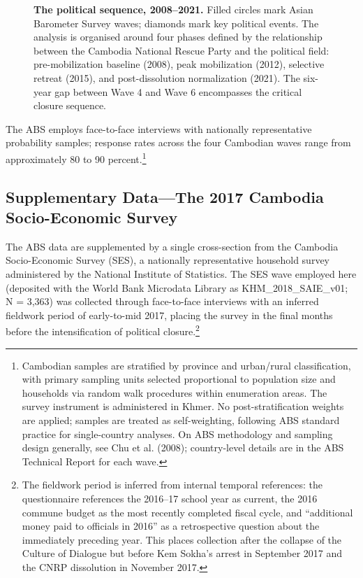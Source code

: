 \documentclass[
  12pt,
  letterpaper]{article}
\begin{document}
\begin{figure}[!htbp]
\caption{\textbf{The political sequence, 2008--2021.}
Filled circles mark Asian Barometer Survey waves; diamonds mark key political events.
The analysis is organised around four phases defined by the relationship between the
Cambodia National Rescue Party and the political field: pre-mobilization baseline (2008),
peak mobilization (2012), selective retreat (2015), and post-dissolution normalization (2021).
The six-year gap between Wave 4 and Wave 6 encompasses the critical closure sequence.}
\label{fig:timeline}
\end{figure}

The ABS employs face-to-face interviews with nationally representative
probability samples; response rates across the four Cambodian waves
range from approximately 80 to 90 percent.\footnote{Cambodian samples
  are stratified by province and urban/rural classification, with
  primary sampling units selected proportional to population size and
  households via random walk procedures within enumeration areas. The
  survey instrument is administered in Khmer. No post-stratification
  weights are applied; samples are treated as self-weighting, following
  ABS standard practice for single-country analyses. On ABS methodology
  and sampling design generally, see Chu et al. (2008); country-level
  details are in the ABS Technical Report for each wave.}

\subsection{Supplementary Data---The 2017 Cambodia Socio-Economic
Survey}\label{supplementary-datathe-2017-cambodia-socio-economic-survey}

The ABS data are supplemented by a single cross-section from the
Cambodia Socio-Economic Survey (SES), a nationally representative
household survey administered by the National Institute of Statistics.
The SES wave employed here (deposited with the World Bank Microdata
Library as KHM\_2018\_SAIE\_v01; N = 3,363) was collected through
face-to-face interviews with an inferred fieldwork period of
early-to-mid 2017, placing the survey in the final months before the
intensification of political closure.\footnote{The fieldwork period is
  inferred from internal temporal references: the questionnaire
  references the 2016--17 school year as current, the 2016 commune
  budget as the most recently completed fiscal cycle, and ``additional
  money paid to officials in 2016'' as a retrospective question about
  the immediately preceding year. This places collection after the
  collapse of the Culture of Dialogue but before Kem Sokha's arrest in
  September 2017 and the CNRP dissolution in November 2017.}
\end{document}
